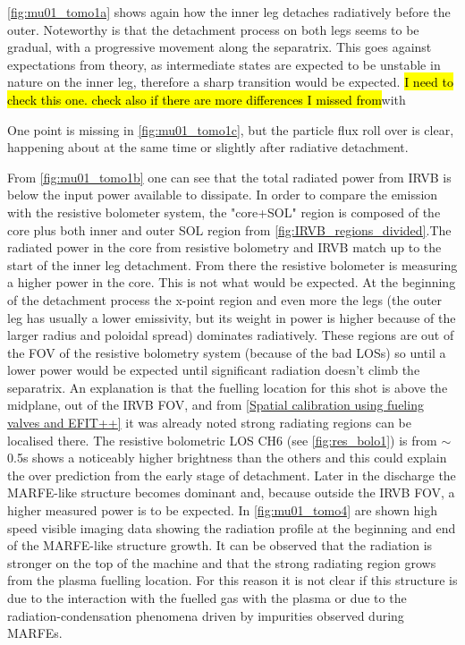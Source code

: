 \autoref{fig:mu01_tomo1a} shows again how the inner leg detaches radiatively before the outer. Noteworthy is that the detachment process on both legs seems to be gradual, with a progressive movement along the separatrix. This goes against expectations from theory, as intermediate states are expected to be unstable in nature on the inner leg, therefore a sharp transition would be expected.\cite{Lipschultz2016} \hl{I need to check this one. check also if there are more differences I missed from}with \cite{Fevrier2021}

One point is missing in \autoref{fig:mu01_tomo1c}, but the particle flux roll over is clear, happening about at the same time or slightly after radiative detachment.

From \autoref{fig:mu01_tomo1b} one can see that the total radiated power from IRVB is below the input power available to dissipate. In order to compare the emission with the resistive bolometer system, the "core+SOL" region is composed of the core plus both inner and outer SOL region from \autoref{fig:IRVB_regions_divided}.The radiated power in the core from resistive bolometry and IRVB match up to the start of the inner leg detachment. From there the resistive bolometer is measuring a higher power in the core. This is not what would be expected. At the beginning of the detachment process the x-point region and even more the legs (the outer leg has usually a lower emissivity, but its weight in power is higher because of the larger radius and poloidal spread) dominates radiatively. These regions are out of the FOV of the resistive bolometry system (because of the bad LOSs) so until a lower power would be expected until significant radiation doesn't climb the separatrix. An explanation is that the fuelling location for this shot is above the midplane, out of the IRVB FOV, and from \autoref{Spatial calibration using fueling valves and EFIT++} it was already noted strong radiating regions can be localised there. The resistive bolometric LOS CH6 (see \autoref{fig:res_bolo1}) is from $\sim$0.5s shows a noticeably higher brightness than the others and this could explain the over prediction from the early stage of detachment. Later in the discharge the MARFE-like structure becomes dominant and, because outside the IRVB FOV, a higher measured power is to be expected. In \autoref{fig:mu01_tomo4} are shown high speed visible imaging data showing the radiation profile at the beginning and end of the MARFE-like structure growth. It can be observed that the radiation is stronger on the top of the machine and that the strong radiating region grows from the plasma fuelling location. For this reason it is not clear if this structure is due to the interaction with the fuelled gas with the plasma or due to the radiation-condensation phenomena driven by impurities observed during MARFEs.\cite{Lipschultz1984}

